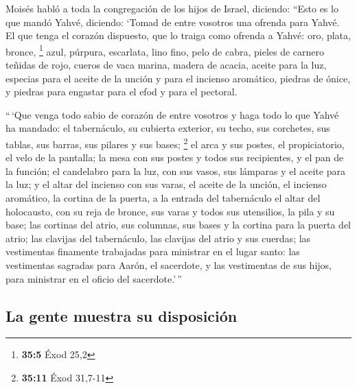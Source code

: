 \begin{paracol}{2}
 Moisés habló a toda la congregación de los hijos de
Israel, diciendo: ``Esto es lo que mandó Yahvé, diciendo: 
`Tomad de entre vosotros una ofrenda para Yahvé. El que tenga el corazón
dispuesto, que lo traiga como ofrenda a Yahvé: oro, plata, bronce,
\footnote{\textbf{35:5} Éxod 25,2}  azul, púrpura,
escarlata, lino fino, pelo de cabra,  pieles de carnero
teñidas de rojo, cueros de vaca marina, madera de acacia, 
aceite para la luz, especias para el aceite de la unción y para el
incienso aromático,  piedras de ónice, y piedras para
engastar para el efod y para el pectoral.

 ``\,`Que venga todo sabio de corazón de entre vosotros y
haga todo lo que Yahvé ha mandado:  el tabernáculo, su
cubierta exterior, su techo, sus corchetes, sus tablas, sus barras, sus
pilares y sus bases; \footnote{\textbf{35:11} Éxod 31,7-11}
 el arca y sus postes, el propiciatorio, el velo de la
pantalla;  la mesa con sus postes y todos sus
recipientes, y el pan de la función;  el candelabro para
la luz, con sus vasos, sus lámparas y el aceite para la luz;
 y el altar del incienso con sus varas, el aceite de la
unción, el incienso aromático, la cortina de la puerta, a la entrada del
tabernáculo  el altar del holocausto, con su reja de
bronce, sus varas y todos sus utensilios, la pila y su base;
 las cortinas del atrio, sus columnas, sus bases y la
cortina para la puerta del atrio;  las clavijas del
tabernáculo, las clavijas del atrio y sus cuerdas;  las
vestimentas finamente trabajadas para ministrar en el lugar santo: las
vestimentas sagradas para Aarón, el sacerdote, y las vestimentas de sus
hijos, para ministrar en el oficio del sacerdote.'\,''

\hypertarget{la-gente-muestra-su-disposiciuxf3n}{%
\subsection{La gente muestra su
disposición}\label{la-gente-muestra-su-disposiciuxf3n}}


\end{paracol}

